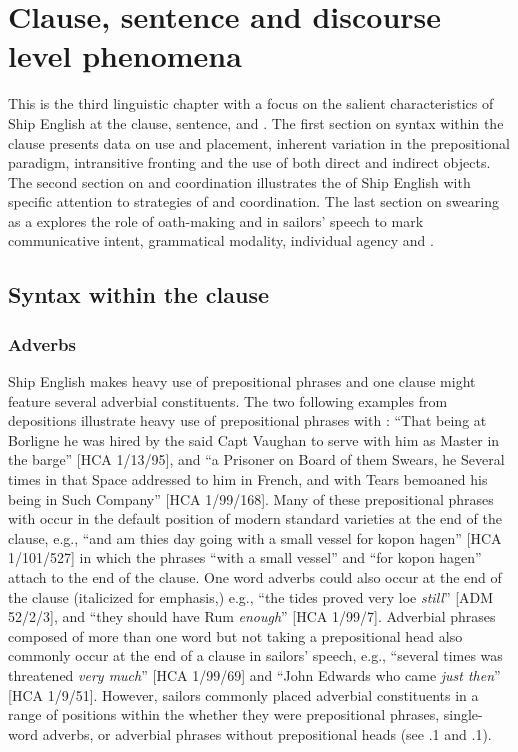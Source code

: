 \chapter{{Clause, sentence and discourse level phenomena}}

This is the third linguistic chapter with a focus on the salient characteristics of Ship English at the clause, sentence, and . The first section on syntax within the clause presents data on  use and placement, inherent variation in the prepositional paradigm, intransitive  fronting and the use of both direct and indirect objects. The second section on  and coordination illustrates the  of Ship English with specific attention to strategies of  and coordination. The last section on swearing as a  explores the role of oath-making and  in sailors’ speech to mark communicative intent, grammatical modality, individual agency and . 

\section{{Syntax within the clause}}%

\subsection{{Adverbs}}%

Ship English makes heavy use of prepositional phrases and one clause might feature several adverbial constituents. The two following examples from depositions illustrate heavy use of prepositional phrases with : “That being at Borligne he was hired by the said Capt Vaughan to serve with him as Master in the barge” [HCA 1/13/95], and “a Prisoner on Board of them Swears, he Several times in that Space addressed to him in French, and with Tears bemoaned his being in Such Company” [HCA 1/99/168]. Many of these prepositional phrases with  occur in the default position of modern standard varieties at the end of the clause, e.g., “and am thies day going with a small vessel for kopon hagen” [HCA 1/101/527] in which the phrases “with a small vessel” and “for kopon hagen” attach to the end of the clause. One word adverbs could also occur at the end of the clause (italicized for emphasis,) e.g., “the tides proved very loe \textit{still}” [ADM 52/2/3], and “they should have Rum \textit{enough}” [HCA 1/99/7]. Adverbial phrases composed of more than one word but not taking a prepositional head also commonly occur at the end of a clause in sailors’ speech, e.g., “several times was threatened \textit{very much}” [HCA 1/99/69] and “John Edwards who came \textit{just then}” [HCA 1/9/51]. However, sailors commonly placed adverbial constituents in a range of positions within the  whether they were prepositional phrases, single-word adverbs, or adverbial phrases without prepositional heads (see .1 and .1). 

